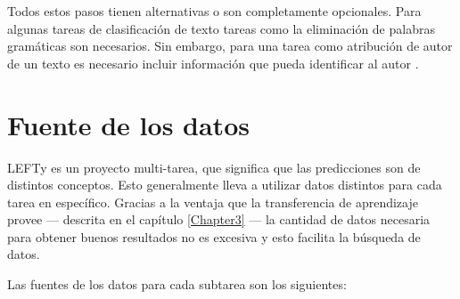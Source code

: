 Todos estos pasos tienen alternativas o son completamente opcionales. Para algunas tareas de clasificación de texto tareas como la eliminación de palabras gramáticas son necesarios. Sin embargo, para una tarea como atribución de autor de un texto es necesario incluir información que pueda identificar al autor \parencite{coulthard2004author, louwerse2004semantic}.

\section{Fuente de los datos}

LEFTy es un proyecto multi-tarea, que significa que las predicciones son de distintos conceptos. Esto generalmente lleva a utilizar datos distintos para cada tarea en específico. Gracias a la ventaja que la transferencia de aprendizaje provee --- descrita en el capítulo \ref{Chapter3} --- la cantidad de datos necesaria para obtener buenos resultados no es excesiva y esto facilita la búsqueda de datos.

Las fuentes de los datos para cada subtarea son los siguientes:

